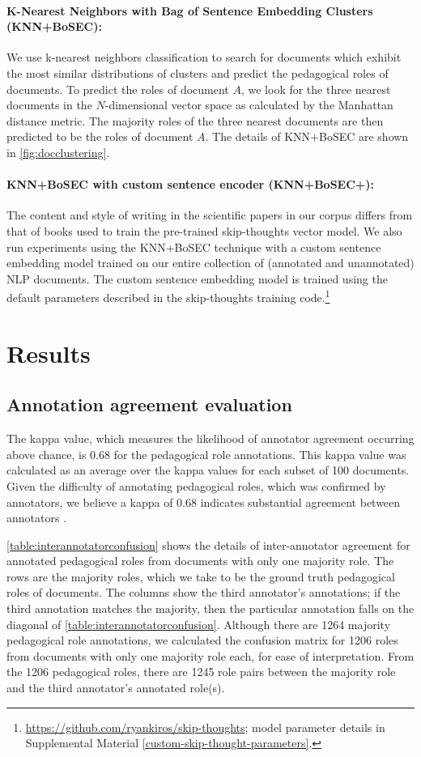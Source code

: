 \documentclass[11pt,a4paper]{article}
\begin{document}
\paragraph{K-Nearest Neighbors with Bag of Sentence Embedding Clusters (KNN+BoSEC):} We use k-nearest neighbors classification to search for documents which exhibit the most similar distributions of clusters and predict the pedagogical roles of documents. To predict the roles of document $A$, we look for the three nearest documents in the $N$-dimensional vector space as calculated by the Manhattan distance metric. The majority roles of the three nearest documents are then predicted to be the roles of document $A$. The details of KNN+BoSEC are shown in \autoref{fig:docclustering}.

\paragraph{KNN+BoSEC with custom sentence encoder (KNN+BoSEC+):} The content and style of writing in the scientific papers in our corpus differs from that of books used to train the pre-trained skip-thoughts vector model. We also run experiments using the KNN+BoSEC technique with a custom sentence embedding model trained on our entire collection of (annotated and unannotated) NLP documents. The custom sentence embedding model is trained using the default parameters described in the skip-thoughts training code.\footnote{\url{https://github.com/ryankiros/skip-thoughts}; model parameter details in Supplemental Material \ref{custom-skip-thought-parameters}.}

\section{Results}
\label{sec:results}

\subsection{Annotation agreement evaluation}
The kappa value, which measures the likelihood of annotator agreement occurring above chance, is 0.68 for the pedagogical role annotations. This kappa value was calculated as an average over the kappa values for each subset of 100 documents. Given the difficulty of annotating pedagogical roles, which was confirmed by annotators, we believe a kappa of 0.68 indicates substantial agreement between annotators \cite{landis1977measurement}.

\autoref{table:interannotatorconfusion} shows the details of inter-annotator agreement for annotated pedagogical roles from documents with only one majority role. The rows are the majority roles, which we take to be the ground truth pedagogical roles of documents. The columns show the third annotator's annotations; if the third annotation matches the majority, then the particular annotation falls on the diagonal of \autoref{table:interannotatorconfusion}. Although there are 1264 majority pedagogical role annotations, we calculated the confusion matrix for 1206 roles from documents with only one majority role each, for ease of interpretation. From the 1206 pedagogical roles, there are 1245 role pairs between the majority role and the third annotator's annotated role(s).
\end{document}
